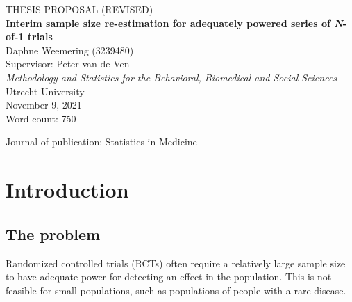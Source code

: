 \documentclass[11pt]{article}
\begin{document}

\begin{titlepage}
\begin{center}

\vspace*{0.01cm}
THESIS PROPOSAL (REVISED) \\

\vspace{2cm}
\Large
\textbf{Interim sample size re-estimation for adequately powered series of \textit{N}-of-1 trials} \\

\vspace{2cm}
\large
{Daphne Weemering (3239480)} \\

\vspace{0.3cm}
Supervisor: Peter van de Ven \\

\vspace{2cm}
\large
\textit{Methodology and Statistics for the Behavioral, Biomedical and Social Sciences} \\

\vspace{0.3cm}
Utrecht University \\

\vspace{1.5cm}
\large 
November 9, 2021 \\

\vspace{4.6cm}
Word count: 750

\vspace{1cm} 
Journal of publication: Statistics in Medicine

\end{center}
\end{titlepage}



\section{Introduction}
\subsection{The problem}
Randomized controlled trials (RCTs) often require a relatively large sample size to have adequate power for detecting an effect in the population. This is not feasible for small populations, such as populations of people with a rare disease. \par
\end{document}

